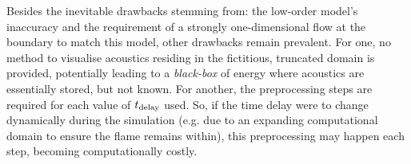 Besides the inevitable drawbacks stemming from: the low-order model's inaccuracy and the requirement of a strongly one-dimensional flow at the boundary to match this model, other drawbacks remain prevalent. For one, no method to visualise acoustics residing in the fictitious, truncated domain is provided, potentially leading to a \emph{black-box} of energy where acoustics are essentially stored, but not known. For another, the preprocessing steps are required for each value of $t_{\rm{delay}}$ used. So, if the time delay were to change dynamically during the simulation (e.g. due to an expanding computational domain to ensure the flame remains within), this preprocessing may happen each step, becoming computationally costly.





